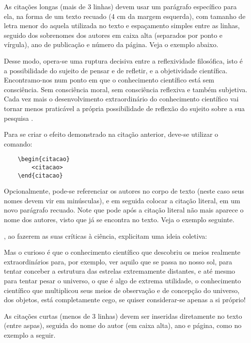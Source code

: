 As citações longas (mais de 3 linhas) devem usar um parágrafo específico para ela, na forma de um texto recuado (4 cm da margem esquerda), com tamanho de letra menor do aquela utilizada no texto e espaçamento simples entre as linhas, seguido dos sobrenomes dos autores em caixa alta (separados por ponto e vírgula), ano de publicação e número da página.
Veja o exemplo abaixo.

\begin{citacao}
Desse modo, opera-se uma ruptura decisiva entre a reflexividade filosófica, isto é a possibilidade do sujeito de pensar e de refletir, e a objetividade científica.
Encontramo-nos num ponto em que o conhecimento científico está sem consciência.
Sem consciência moral, sem consciência reflexiva e também subjetiva.
Cada vez mais o desenvolvimento extraordinário do conhecimento científico vai tornar menos praticável a própria possibilidade de reflexão do sujeito sobre a sua pesquisa \cite[p.~28]{morinmoigne:2000}.
\end{citacao}

Para se criar o efeito demonstrado na citação anterior, deve-se utilizar o comando:
\begin{verbatim}
    \begin{citacao}
        <citacao>
    \end{citacao}
\end{verbatim}

Opcionalmente, pode-se referenciar os autores no corpo de texto (neste caso seus nomes devem vir em minúsculas), e em seguida colocar a citação literal, em um novo parágrafo recuado.
Note que pode após a citação literal não mais aparece o nome dos autores, visto que já se encontra no texto.
Veja o exemplo seguinte.

, ao fazerem as suas críticas à ciência, explicitam uma ideia coletiva:

\begin{citacao}
Mas o curioso é que o conhecimento científico que descobriu os meios realmente extraordinários para, por exemplo, ver aquilo que se passa no nosso sol, para tentar conceber a estrutura das estrelas extremamente distantes, e até mesmo para tentar pesar o universo, o que é algo de extrema utilidade, o conhecimento científico que multiplicou seus meios de observação e de concepção do universo, dos objetos, está completamente cego, se quiser considerar-se apenas a si próprio!
\end{citacao}

As citações curtas (menos de 3 linhas) devem ser inseridas diretamente no texto (entre aspas), seguida do nome do autor (em caixa alta), ano e página, como no exemplo a seguir.

